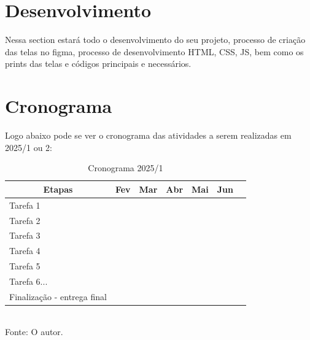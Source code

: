 \section{Desenvolvimento}

Nessa section estará todo o desenvolvimento do seu projeto, processo de criação das telas no figma, processo de desenvolvimento HTML, CSS, JS, bem como os prints das telas e códigos principais e necessários.

\section{Cronograma}

Logo abaixo pode se ver o cronograma das atividades a serem realizadas em 2025/1 ou 2:%

\begin{table}[!h]
\centering
\caption{Cronograma 2025/1}
\label{table:1}
\begin{tabular}{|l|l|l|l|l|l|l|}
\hline
\multicolumn{1}{|c|}{\textbf{Etapas}}            & Fev                      & \multicolumn{1}{c|}{Mar} & Abr                      & Mai                      & Jun\\ \hline
Tarefa 1                   & \cellcolor[HTML]{9B9B9B} & \cellcolor[HTML]{9B9B9B} &                          &                          &          \\ \hline
Tarefa 2       &                          & \cellcolor[HTML]{9B9B9B} & \cellcolor[HTML]{9B9B9B} & \cellcolor[HTML]{9B9B9B} &                \\ \hline
Tarefa 3                   &                          & \cellcolor[HTML]{9B9B9B} & \cellcolor[HTML]{9B9B9B} & \cellcolor[HTML]{9B9B9B} &                  \\ \hline
Tarefa 4                  &                          & \cellcolor[HTML]{9B9B9B} & \cellcolor[HTML]{9B9B9B} &                          &                 \\ \hline
Tarefa 5                   &                          &                          & \cellcolor[HTML]{9B9B9B} & \cellcolor[HTML]{9B9B9B} &             \\ \hline
Tarefa 6...                     &                          &                          &                          & \cellcolor[HTML]{9B9B9B} & \cellcolor[HTML]{9B9B9B} \\ \hline
Finalização - entrega final                     &                          &                          &                          &     & \cellcolor[HTML]{9B9B9B} \\ \hline
\end{tabular}
\\[0.5em] {Fonte: O autor.}
\end{table}
 
 \pagebreak
 
